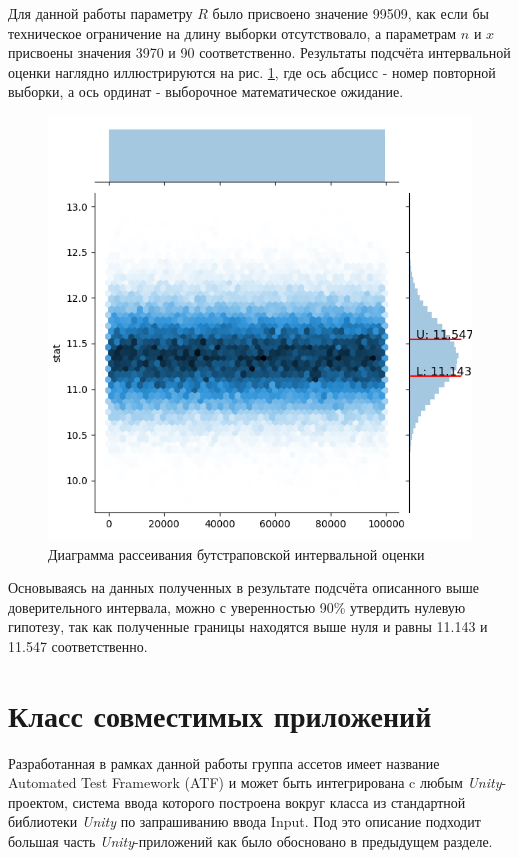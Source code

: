 Для данной работы параметру $R$ было присвоено значение 99509, как если бы техническое ограничение на длину выборки отсутствовало, а параметрам $n$ и $x$ присвоены значения 3970 и 90 соответственно. Результаты подсчёта интервальной оценки наглядно иллюстрируются на рис. \ref{experiment}, где ось абсцисс - номер повторной выборки, а ось ординат - выборочное математическое ожидание.

\begin{figure}[H]
	\centering
	\includegraphics[width=\linewidth]{experiment.png}
	\caption{Диаграмма рассеивания бутстраповской интервальной оценки}
	\label{experiment}
\end{figure}

Основываясь на данных полученных в результате подсчёта описанного выше доверительного интервала, можно с уверенностью 90\% утвердить нулевую гипотезу, так как полученные границы находятся выше нуля и равны 11.143 и 11.547 соответственно.

\section{Класс совместимых приложений}
Разработанная в рамках данной работы группа ассетов имеет название Automated Test Framework (ATF) и может быть интегрирована c любым  \textit{Unity}-проектом, система ввода которого построена вокруг класса из стандартной библиотеки \textit{Unity} по запрашиванию ввода Input. Под это описание подходит большая часть \textit{Unity}-приложений как было обосновано в предыдущем разделе.

